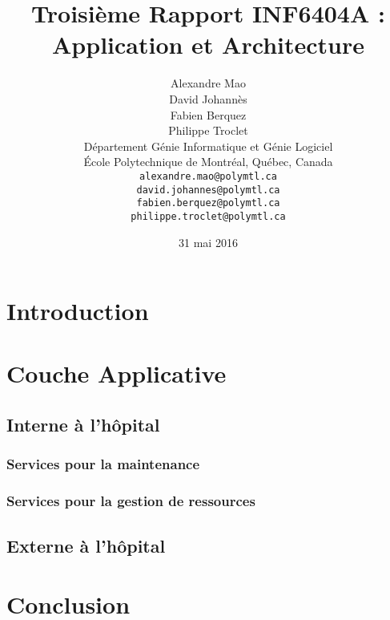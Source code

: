 \documentclass{article}
\title{Troisième Rapport INF6404A : Application et Architecture}
\author{
	Alexandre Mao\\
	David Johannès \\
	Fabien Berquez \\
	Philippe Troclet \\
	D\'{e}partement G\'{e}nie Informatique et G\'{e}nie Logiciel \\
	\'{E}cole Polytechnique de Montr\'{e}al, Qu\'{e}bec, Canada \\
	\texttt{alexandre.mao@polymtl.ca}\\
	\texttt{david.johannes@polymtl.ca}\\
	\texttt{fabien.berquez@polymtl.ca}   \\
	\texttt{philippe.troclet@polymtl.ca}   \\
}
\date{31 mai 2016}
\begin{document}
\maketitle

\section{Introduction}


 
\section{Couche Applicative}
\subsection{Interne à l'hôpital}
\subsubsection{Services pour la maintenance}

\subsubsection{Services pour la gestion de ressources}

\subsection{Externe à l'hôpital}

  


\section{Conclusion}










\end{document}
